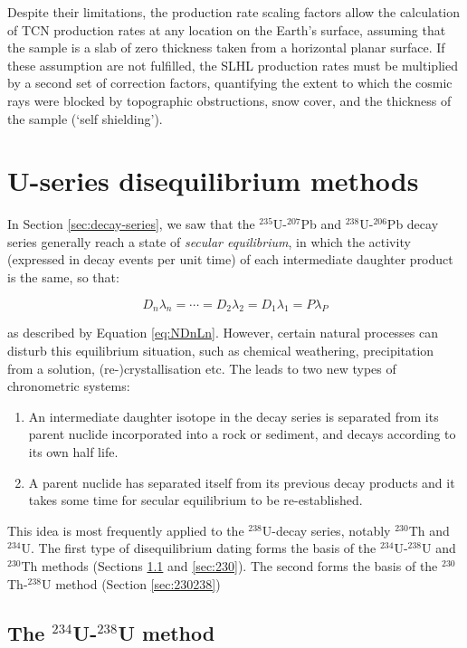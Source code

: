 \documentclass{book}
\begin{document}
Despite their limitations, the production rate scaling factors allow
the calculation of TCN production rates at any location on the Earth's
surface, assuming that the sample is a slab of zero thickness taken
from a horizontal planar surface. If these assumption are not
fulfilled, the SLHL production rates must be multiplied by a second
set of correction factors, quantifying the extent to which the cosmic
rays were blocked by topographic obstructions, snow cover, and the
thickness of the sample (`self shielding').

\chapter[U-series dating]{U-series disequilibrium methods}
\label{sec:U-series}

In Section \ref{sec:decay-series}, we saw that the
$^{235}$U-$^{207}$Pb and $^{238}$U-$^{206}$Pb decay series generally
reach a state of \emph{secular equilibrium}, in which the activity
(expressed in decay events per unit time) of each intermediate
daughter product is the same, so that:

$$D_n \lambda_n = \cdots  = D_2 \lambda_2 = D_1 \lambda_1 = P \lambda_P$$

as described by Equation \ref{eq:NDnLn}. However, certain natural
processes can disturb this equilibrium situation, such as chemical
weathering, precipitation from a solution, (re-)crystallisation
etc. The leads to two new types of chronometric systems:

\begin{enumerate}
\item An intermediate daughter isotope in the decay series is
  separated from its parent nuclide incorporated into a rock or
  sediment, and decays according to its own half life.
\item A parent nuclide has separated itself from its previous decay
  products and it takes some time for secular equilibrium to be
  re-established.
\end{enumerate}

This idea is most frequently applied to the $^{238}$U-decay series,
notably $^{230}$Th and $^{234}$U. The first type of disequilibrium
dating forms the basis of the $^{234}$U-$^{238}$U and $^{230}$Th
methods (Sections \ref{sec:234238} and \ref{sec:230}). The second
forms the basis of the $^{230}$Th-$^{238}$U method (Section
\ref{sec:230238})

\section{The $^{234}$U-$^{238}$U method}
\label{sec:234238}
\end{document}
